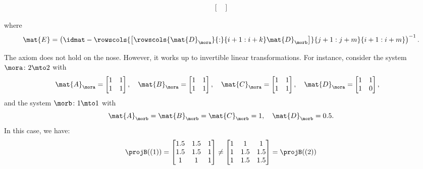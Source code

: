 {\begin{example}
\begin{widepar}
\begin{equation*}
\begin{aligned}
\begin{bmatrix}
                               \end{bmatrix}
            \end{aligned}
        \end{equation*}
    \end{widepar}
    where
    \begin{equation*}
        \mat{E}=\left(\idmat - \rowscols{\begin{bmatrix}
                \rowscols{\mat{D}_\mora}{:}{i+1:i+k}\mat{D}_\morb
            \end{bmatrix}}{j+1:j+m}{i+1:i+m}\right)^{-1}.
    \end{equation*}

    The axiom does not hold on the nose.
    However, it works up to invertible linear transformations.
    For instance, consider the system $\mora \colon 2\mto 2$ with
    \begin{equation*}
        \mat{A}_\mora = \begin{bmatrix} 1&1\\ 1&1\end{bmatrix},\quad
        \mat{B}_\mora = \begin{bmatrix} 1&1\\ 1&1\end{bmatrix},\quad
        \mat{C}_\mora = \begin{bmatrix} 1&1\\ 1&1\end{bmatrix},\quad
        \mat{D}_\mora = \begin{bmatrix} 1&1\\ 1&0\end{bmatrix},\quad
    \end{equation*}
    and the system $\morb\colon 1\mto 1$ with
    \begin{equation*}
        \mat{A}_\morb=\mat{B}_\morb=\mat{C}_\morb=1,\quad \mat{D}_\morb=0.5.
    \end{equation*}
    In this case, we have:
    \begin{equation*}
        \projB((1))=\begin{bmatrix}1.5&1.5&1\\ 1.5&1.5&1\\ 1&1&1 \end{bmatrix}\neq
        \begin{bmatrix}1&1&1\\ 1&1.5&1.5\\ 1&1.5&1.5 \end{bmatrix}=\projB((2))

\end{equation*}
\end{example}}
